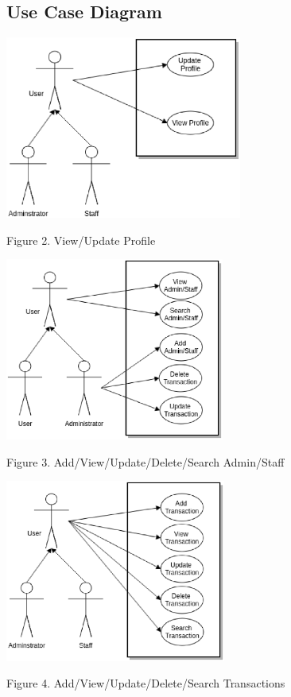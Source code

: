 \documentclass[journal]{./IEEE/IEEEtran}
\begin{document}
\subsection{Use Case Diagram}
\begin{center}

\includegraphics[height=60mm]{./images/useCase/profile.eps}

Figure 2. View/Update Profile

\includegraphics[height=60mm]{./images/useCase/adminstaff.eps}

Figure 3. Add/View/Update/Delete/Search Admin/Staff

\includegraphics[height=60mm]{./images/useCase/transaction.eps}

Figure 4. Add/View/Update/Delete/Search Transactions


\end{center}
\end{document}
